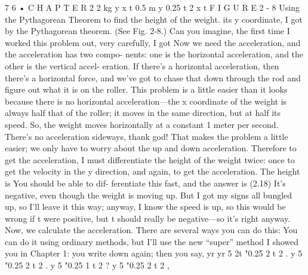 \documentclass[10pt,oneside]{article}
\begin{document}
7 6 • C H A P T E R  2 2 kg y x t 0.5 m y      0.25   t 2 x   t F I G U R E 2 - 8 Using the Pythagorean Theorem to find the height of the weight. its y coordinate, I got by the Pythagorean theorem. (See Fig. 2-8.) Can you imagine, the first time I worked this problem out, very carefully, I got Now we need the acceleration, and the acceleration has two compo- nents: one is the horizontal acceleration, and the other is the vertical accel- eration. If there’s a horizontal acceleration, then there’s a horizontal force, and we’ve got to chase that down through the rod and figure out what it is on the roller. This problem is a little easier than it looks because there is no horizontal acceleration---the x coordinate of the weight is always half that of the roller; it moves in the same direction, but at half its speed. So, the weight moves horizontally at a constant 1 meter per second. There’s no acceleration sideways, thank god! That makes the problem a little easier; we only have to worry about the up and down acceleration. Therefore to get the acceleration, I must differentiate the height of the weight twice: once to get the velocity in the y direction, and again, to get the acceleration. The height is You should be able to dif- ferentiate this fast, and the answer is (2.18) It’s negative, even though the weight is moving up. But I got my signs all bungled up, so I’ll leave it this way; anyway, I know the speed is up, so this would be wrong if t were positive, but t should really be negative---so it’s right anyway. Now, we calculate the acceleration. There are several ways you can do this: You can do it using ordinary methods, but I’ll use the new “super” method I showed you in Chapter 1: you write down again; then you say, yr yr 5 2t "0.25 2 t 2 . y 5 "0.25 2 t 2 . y 5 "0.25 1 t 2 ? y 5 "0.25 2 t 2 ,\par
\end{document}
